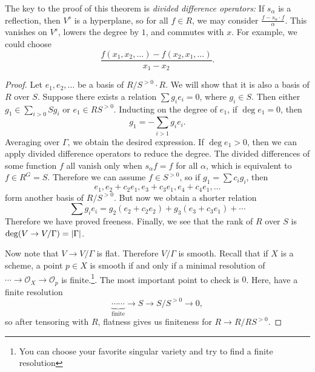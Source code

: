 \documentclass[leqno, openany]{memoir}
\theoremstyle{definition}
\theoremstyle{remark}
\theoremstyle{plain}
\theoremstyle{definition}
\theoremstyle{remark}
\newcommand{\mc}[1]{\mathcal{#1}}
\begin{document}
The key to the proof of this theorem is \textit{divided difference operators:}
If $s_{\alpha}$ is a reflection, then $V^s$ is a hyperplane, so for all $f \in
R$, we may consider $\frac{ f - s_{\alpha} \cdot f }{\alpha}$. This vanishes on
$V^s$, lowers the degree by $1$, and commutes with $x$. For example, we could
choose \[ \frac{f(x_1, x_2, \ldots) - f(x_2, x_1, \ldots)}{x_1 - x_2}. \]

\begin{proof} Let $e_1, e_2, \ldots$ be a basis of $R/S^{>0} \cdot R$. We will
    show that it is also a basis of $R$ over $S$. Suppose there exists a
    relation $\sum g_i e_i = 0$, where $g_i \in S$. Then either $g_1 \in
    \sum_{i > 0} S g_i$ or $e_1 \in RS^{>0}$. Inducting on the degree of $e_1$,
    if $\deg e_1 = 0$, then \[ g_1 = - \sum_{i > 1} g_i e_i. \] Averaging over
    $\Gamma$, we obtain the desired expression. If $\deg e_1 > 0$, then we can
    apply divided difference operators to reduce the degree. The divided
    differences of some function $f$ all vanish only when $s_{\alpha} f = f$
    for all $\alpha$, which is equivalent to $f \in R^G = S$. Therefore we can
    assume $f \in S^{>0}$, so if $g_1 = \sum c_i g_i$, then \[ e_1, e_2 + c_2
        e_1, e_3 + c_3 e_1, e_4 + c_4 e_1, \ldots \] form another basis of
        $R/S^{>0}$. But now we obtain a shorter relation \[ \sum g_i e_i = g_2
        (e_2 + c_2 e_2) + g_3(e_3 + c_3 e_1) + \cdots \] Therefore we have
        proved freeness. Finally, we see that the rank of $R$ over $S$ is $\deg
        (V \to V/\Gamma) = \abs{\Gamma}$.

    Now note that $V \to V/\Gamma$ is flat. Therefore $V/\Gamma$ is smooth.
    Recall that if $X$ is a scheme, a point $p \in X$ is smooth if and only if
    a minimal resolution of $\cdots \to \mc{O}_X \to \mc{O}_p$ is
    finite.\footnote{You can choose your favorite singular variety and try to
    find a finite resolution}. The most important point to check is $0$. Here,
    have a finite resolution \[ \underbrace{\cdots \cdots}_{\text{finite}} \to
    S \to S/S^{>0} \to 0, \] so after tensoring with $R$, flatness gives us
    finiteness for $R \to R/RS^{>0}$.


\end{proof}
\end{document}
